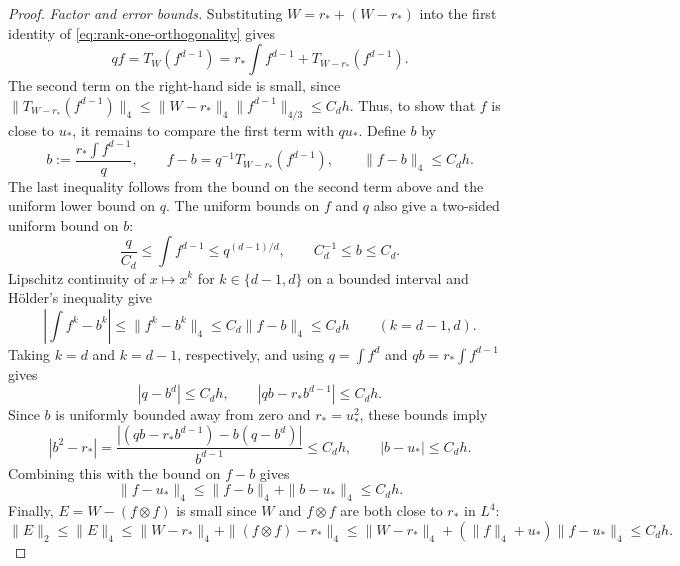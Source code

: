 \begin{proof}
\medskip
\noindent\emph{Factor and error bounds.}
Substituting $W=r_*+(W-r_*)$ into the first identity of
\eqref{eq:rank-one-orthogonality} gives
\[
  qf=T_W(f^{d-1})
  =r_*\int f^{d-1}+T_{W-r_*}(f^{d-1}).
\]
The second term on the right-hand side is small, since
$\|T_{W-r_*}(f^{d-1})\|_4 \le\|W-r_*\|_4\|f^{d-1}\|_{4/3} \le C_d h$.
Thus, to show that $f$ is close to $u_*$, it remains to compare the
first term with $qu_*$.  Define $b$ by
\[
  b:=\frac{r_*\int f^{d-1}}q,
  \qquad
  f-b=q^{-1}T_{W-r_*}(f^{d-1}),
  \qquad
  \|f-b\|_4\le C_dh.
\]
The last inequality follows from the bound on the second term above and the
uniform lower bound on $q$.  The uniform bounds on $f$ and $q$ also give a
two-sided uniform bound on $b$:
\[
  \frac{q}{C_d}\le\int f^{d-1}\le q^{(d-1)/d},
  \qquad
  C_d^{-1}\le b\le C_d.
\]
Lipschitz continuity of $x\mapsto x^k$ for $k\in\{d-1,d\}$
on a bounded interval and H\"older's inequality give
\[
  \left|\int f^k-b^k\right|
  \le \|f^k-b^k\|_4
  \le C_d\|f-b\|_4
  \le C_dh
  \qquad(k=d-1,d).
\]
Taking $k=d$ and $k=d-1$, respectively, and using
$q=\int f^d$ and $qb=r_*\int f^{d-1}$ gives
\[
  |q-b^d|\le C_dh,
  \qquad
  |qb-r_*b^{d-1}|\le C_dh.
\]
Since $b$ is uniformly bounded away from zero and $r_*=u_*^2$, these bounds imply
\[
  |b^2-r_*| = \frac{\left| (qb-r_*b^{d-1})-b(q-b^d) \right|}{b^{d-1}} \le C_dh,
  \qquad
  |b-u_*| \le C_dh.
\]
Combining this with the bound on $f-b$ gives
\[
  \|f-u_*\|_4\le \|f-b\|_4+\|b-u_*\|_4\le C_dh.
\]
Finally, $E=W-(f\otimes f)$ is small since $W$ and $f \otimes f$ are both close to $r_*$ in $L^4$:
\begin{equation*}
  \|E\|_2\le\|E\|_4
  \le \|W-r_*\|_4+\|(f\otimes f)-r_*\|_4
  \le \|W-r_*\|_4+(\|f\|_4+u_*)\|f-u_*\|_4
  \le C_dh.
\end{equation*}


\end{proof}

